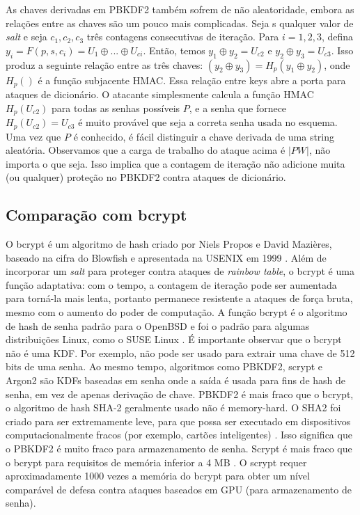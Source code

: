 \documentclass[conference]{IEEEtran}
\begin{document}
As chaves derivadas em PBKDF2 também sofrem de não aleatoridade, embora as relações 
entre as chaves são um pouco mais complicadas. Seja s qualquer valor de \textit{salt}
e seja $c_1, c_2, c_3$ três contagens consecutivas de iteração. Para $i = 1, 2, 3$, defina
$y_i = F (p, s, c_i) = U_1 \oplus ... \oplus U_{ci}$. Então, temos $y_1 \oplus y_2 = U_{c2}$ e $y_2 \oplus y_3 = U_{c3}$.
Isso produz a seguinte relação entre as três chaves: $(y_2 \oplus y_3) = H_p (y_1 \oplus y_2)$,
onde $H_p()$ é a função subjacente HMAC.
Essa relação entre keys abre a porta para ataques de dicionário. O atacante simplesmente 
calcula a função HMAC $H_p (U_{c2})$ para todas as senhas possíveis $P$, e a senha que 
fornece $H_p (U_{c2}) = U_{c3}$ é muito provável que seja a correta
senha usada no esquema. Uma vez que $P$ é conhecido, é fácil distinguir a
chave derivada de uma string aleatória. Observamos que a carga de trabalho do ataque acima 
é $| P W |$, não importa o que seja. Isso implica que a contagem de iteração não
adicione muita (ou qualquer) proteção no PBKDF2 contra ataques de dicionário. \cite{Yao2005Design}

\subsection{Comparação com bcrypt}

O bcrypt é um algoritmo de hash criado por Niels Propos e David Mazières, 
baseado na cifra do Blowfish e apresentada na USENIX em 1999 \cite{bcryptspec}. Além de incorporar 
um \textit{salt} para proteger contra ataques de \textit{rainbow table}, o bcrypt é uma função adaptativa: 
com o tempo, a contagem de iteração pode ser aumentada para torná-la mais lenta, 
portanto permanece resistente a ataques de força bruta, mesmo com o 
aumento do poder de computação.
A função bcrypt é o algoritmo de hash de senha padrão para o OpenBSD \cite{bcryptbsd} e foi o padrão 
para algumas distribuições Linux, como o SUSE Linux \cite{bcryptsuse}.
É importante observar que o bcrypt não é uma KDF. Por exemplo, não pode ser usado 
para extrair uma chave de 512 bits de uma senha. 
Ao mesmo tempo, algoritmos como PBKDF2, scrypt e Argon2 são KDFs baseadas em senha 
onde a saída é usada para fins de hash de senha, em vez de apenas derivação de chave.
PBKDF2 é mais fraco que o bcrypt, o algoritmo de hash SHA-2 geralmente usado não é memory-hard. 
O SHA2 foi criado para ser extremamente leve, para que possa ser executado 
em dispositivos computacionalmente fracos (por exemplo, cartões inteligentes) \cite{SHS2002}. 
Isso significa que o PBKDF2 é muito fraco para armazenamento de senha. Scrypt é mais fraco que 
o bcrypt para requisitos de memória inferior a 4 MB \cite{anthony2014why}.
O scrypt requer aproximadamente 1000 vezes a memória do bcrypt para obter um nível 
comparável de defesa contra ataques baseados em GPU (para armazenamento de senha). \cite{bcryptwiki}
\end{document}
